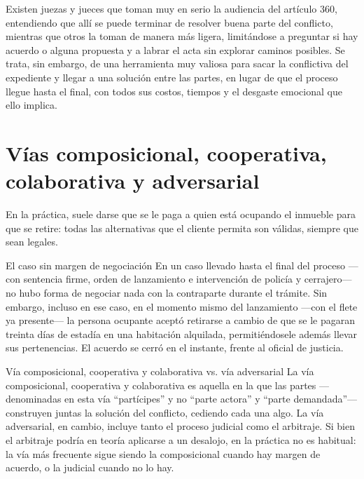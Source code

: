 \documentclass[12pt,oneside]{book}
\begin{document}
\begin{important}
Existen juezas y jueces que toman muy en serio la audiencia del artículo 360, entendiendo que allí se puede terminar de resolver buena parte del conflicto, mientras que otros la toman de manera más ligera, limitándose a preguntar si hay acuerdo o alguna propuesta y a labrar el acta sin explorar caminos posibles. Se trata, sin embargo, de una herramienta muy valiosa para sacar la conflictiva del expediente y llegar a una solución entre las partes, en lugar de que el proceso llegue hasta el final, con todos sus costos, tiempos y el desgaste emocional que ello implica.
\end{important}

\section{Vías composicional, cooperativa, colaborativa y adversarial}

En la práctica, suele darse que se le paga a quien está ocupando el inmueble para que se retire: todas las alternativas que el cliente permita son válidas, siempre que sean legales.

\begin{example}{El caso sin margen de negociación}
En un caso llevado hasta el final del proceso —con sentencia firme, orden de lanzamiento e intervención de policía y cerrajero— no hubo forma de negociar nada con la contraparte durante el trámite. Sin embargo, incluso en ese caso, en el momento mismo del lanzamiento —con el flete ya presente— la persona ocupante aceptó retirarse a cambio de que se le pagaran treinta días de estadía en una habitación alquilada, permitiéndosele además llevar sus pertenencias. El acuerdo se cerró en el instante, frente al oficial de justicia.
\end{example}

\begin{definition}{Vía composicional, cooperativa y colaborativa vs. vía adversarial}
La vía composicional, cooperativa y colaborativa es aquella en la que las partes —denominadas en esta vía ``partícipes'' y no ``parte actora'' y ``parte demandada''— construyen juntas la solución del conflicto, cediendo cada una algo. La vía adversarial, en cambio, incluye tanto el proceso judicial como el arbitraje. Si bien el arbitraje podría en teoría aplicarse a un desalojo, en la práctica no es habitual: la vía más frecuente sigue siendo la composicional cuando hay margen de acuerdo, o la judicial cuando no lo hay.
\end{definition}
\end{document}
